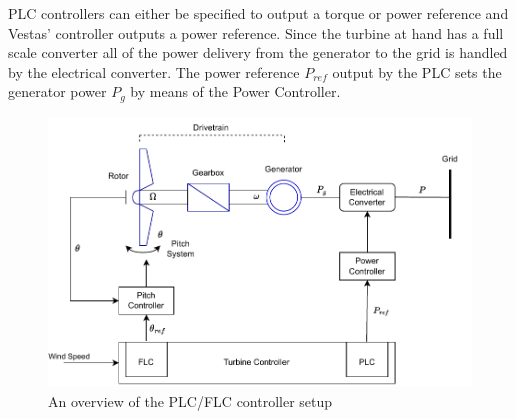 PLC controllers can either be specified to output a torque or power reference and Vestas' controller outputs a power reference. Since the turbine at hand has a full scale converter all of the power delivery from the generator to the grid is handled by the electrical converter. The power reference $ P_{ref} $ output by the PLC sets the generator power $ P_g $ by means of the Power Controller.

\begin{figure}[ht]
	\centering
	\includegraphics[width=0.7\linewidth]{Graphics/PLC_PI.pdf}
	\caption{An overview of the PLC/FLC controller setup}
	\label{fig:controller_overview}
\end{figure}

